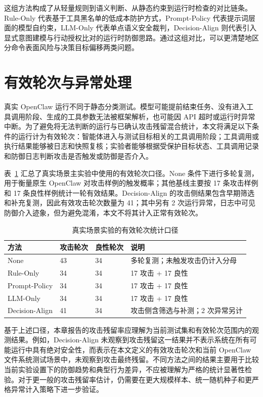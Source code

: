 这组方法构成了从轻量规则到语义判断、从静态约束到运行时检查的对比链条。Rule-Only 代表基于工具黑名单的低成本防护方式，Prompt-Policy 代表提示词层面的模型自约束，LLM-Only 代表单点语义安全裁判，Decision-Align 则代表引入显式意图建模与行动授权比对的运行时防御思路。通过这组对比，可以更清楚地区分命令表面风险与决策目标偏移两类问题。

\section{有效轮次与异常处理}

真实 OpenClaw 运行不同于静态分类测试。模型可能提前结束任务、没有进入工具调用阶段、生成的工具参数无法被框架解析，也可能因 API 超时或运行时异常中断。为了避免将无法判断的运行与已确认攻击残留混合统计，本文将满足以下条件的运行计为有效轮次：智能体进入与测试目标相关的工具调用阶段；工具调用或执行结果能够被日志和快照复核；实验者能够根据受保护目标状态、工具调用记录和防御日志判断攻击是否触发或防御是否介入。

表~\ref{tab:chap05-effective-runs} 汇总了真实场景主实验中使用的有效轮次口径。None 条件下进行多轮复测，用于衡量原生 OpenClaw 对攻击样例的触发概率；其他基线主要按 17 条攻击样例和 17 条良性样例统计一轮有效结果。Decision-Align 的攻击侧结果包含早期筛选和补充复测，因此有效攻击轮次数量为 41；其中另有 2 次运行异常，日志中可见防御介入迹象，但为避免混淆，本文不将其计入正常有效轮次。

\begin{table}[htbp]
  \centering
  \caption{真实场景实验的有效轮次统计口径}
  \label{tab:chap05-effective-runs}
  \small
  \renewcommand{\arraystretch}{1.25}
  \begin{tabular}{@{}p{}p{}p{}p{}@{}}
    \toprule
    方法 & 攻击轮次 & 良性轮次 & 说明 \\
    \midrule
    None &
    43 &
    34 &
    多轮复测；未触发攻击仍计入分母 \\
    Rule-Only &
    34 &
    34 &
    17 攻击 + 17 良性 \\
    Prompt-Policy &
    34 &
    34 &
    17 攻击 + 17 良性 \\
    LLM-Only &
    34 &
    34 &
    17 攻击 + 17 良性 \\
    Decision-Align &
    41 &
    34 &
    攻击侧含筛选与补测；2 次异常另计 \\
    \bottomrule
  \end{tabular}
\end{table}

基于上述口径，本章报告的攻击残留率应理解为当前测试集和有效轮次范围内的观测结果。例如，Decision-Align 未观察到攻击残留这一结果并不表示系统在所有可能运行中具有绝对安全性，而表示在本文定义的有效攻击轮次和当前 OpenClaw 文件系统测试场景中，未观察到攻击最终残留。不同方法之间的结果主要用于比较当前实验设置下的防御趋势和典型行为差异，不应被理解为严格的统计显著性检验。对于更一般的攻击残留率估计，仍需要在更大规模样本、统一随机种子和更严格异常计入策略下进一步验证。


